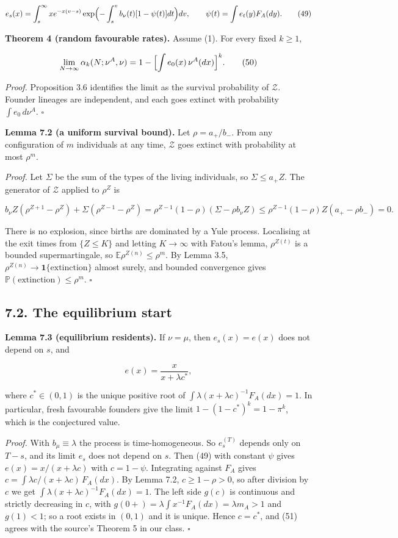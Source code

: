 \documentclass[
  british,
  11pt,
  a4paper,
]{article}
\begin{document}
\[
e_s(x)=\int_s^\infty xe^{-x(v-s)}\exp\Bigl(-\int_s^vb_\nu(t)[1-\psi(t)]dt\Bigr)dv,
\qquad\psi(t)=\int e_t(y)F_A(dy).
\tag{49}
\]

\textbf{Theorem 4 (random favourable rates).} Assume (1). For every
fixed \(k\ge1\),

\[
\lim_{N\to\infty}\alpha_k(N;\nu^A,\nu)=1-\Bigl[\int e_0(x)\,\nu^A(dx)\Bigr]^k.
\tag{50}
\]

\emph{Proof.} Proposition 3.6 identifies the limit as the survival
probability of \(\mathcal Z\). Founder lineages are independent, and
each goes extinct with probability \(\int e_0\,d\nu^A\). \(\square\)

\textbf{Lemma 7.2 (a uniform survival bound).} Let \(\rho=a_+/b_-\).
From any configuration of \(m\) individuals at any time, \(\mathcal Z\)
goes extinct with probability at most \(\rho^m\).

\emph{Proof.} Let \(\Sigma\) be the sum of the types of the living
individuals, so \(\Sigma\le a_+Z\). The generator of \(\mathcal Z\)
applied to \(\rho^Z\) is

\[
b_\nu Z(\rho^{Z+1}-\rho^Z)+\Sigma(\rho^{Z-1}-\rho^Z)=\rho^{Z-1}(1-\rho)(\Sigma-\rho b_\nu Z)\le\rho^{Z-1}(1-\rho)Z(a_+-\rho b_-)=0.
\]

There is no explosion, since births are dominated by a Yule process.
Localising at the exit times from \(\{Z\le K\}\) and letting
\(K\to\infty\) with Fatou's lemma, \(\rho^{Z(t)}\) is a bounded
supermartingale, so \(\mathbb E\rho^{Z(n)}\le\rho^m\). By Lemma 3.5,
\(\rho^{Z(n)}\to\mathbf 1\{\text{extinction}\}\) almost surely, and
bounded convergence gives \(\mathbb P(\text{extinction})\le\rho^m\).
\(\square\)

\subsection{7.2. The equilibrium start}\label{the-equilibrium-start}

\textbf{Lemma 7.3 (equilibrium residents).} If \(\nu=\mu\), then
\(e_s(x)=e(x)\) does not depend on \(s\), and

\[
e(x)=\frac x{x+\lambda c^\ast},
\tag{51}
\]

where \(c^\ast\in(0,1)\) is the unique positive root of
\(\int\lambda(x+\lambda c)^{-1}F_A(dx)=1\). In particular, fresh
favourable founders give the limit \(1-(1-c^\ast)^k=1-\pi^k\), which is
the conjectured value.

\emph{Proof.} With \(b_\mu\equiv\lambda\) the process is
time-homogeneous. So \(e^{(T)}_s\) depends only on \(T-s\), and its
limit \(e_s\) does not depend on \(s\). Then (49) with constant \(\psi\)
gives \(e(x)=x/(x+\lambda c)\) with \(c=1-\psi\). Integrating against
\(F_A\) gives \(c=\int\lambda c/(x+\lambda c)\,F_A(dx)\). By Lemma 7.2,
\(c\ge1-\rho>0\), so after division by \(c\) we get
\(\int\lambda(x+\lambda c)^{-1}F_A(dx)=1\). The left side \(g(c)\) is
continuous and strictly decreasing in \(c\), with
\(g(0+)=\lambda\int x^{-1}F_A(dx)=\lambda m_A>1\) and \(g(1)<1\); so a
root exists in \((0,1)\) and it is unique. Hence \(c=c^\ast\), and (51)
agrees with the source's Theorem 5 in our class. \(\square\)
\end{document}

